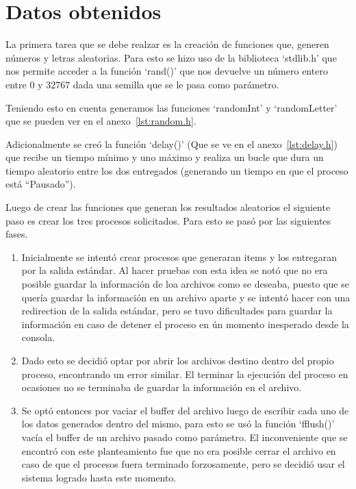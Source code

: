 \section{Datos obtenidos}

La primera tarea que se debe realzar es la creación de funciones que, generen números y letras aleatorias. Para esto se hizo uso de la biblioteca `stdlib.h' que nos permite acceder a la función `rand()' que nos devuelve un número entero entre $0$ y $32767$ dada una semilla que se le pasa como parámetro.

Teniendo esto en cuenta generamos las funciones `randomInt' y `randomLetter' que se pueden ver en el anexo~\ref{lst:random.h}.

Adicionalmente se creó la función `delay()'  (Que se ve en el anexo~\ref{lst:delay.h}) que recibe un tiempo mínimo y uno máximo y realiza un bucle que dura un tiempo aleatorio entre los dos entregados (generando un tiempo en que el proceso está ``Pausado'').

Luego de crear las funciones que generan los resultados aleatorios el siguiente paso es crear los tres procesos solicitados. Para esto se pasó por las siguientes fases.
\begin{enumerate}
    \item Inicialmente se intentó crear procesos que generaran items y los entregaran por la salida estándar.
    Al hacer pruebas con esta idea se notó que no era posible guardar la información de loa archivos como se deseaba, puesto que se quería guardar la información en un archivo aparte y se intentó hacer con una redirection de la salida estándar, pero se tuvo dificultades para guardar la información en caso de detener el proceso en ún momento inesperado desde la consola.
    \item Dado esto se decidió optar por abrir los archivos destino dentro del propio proceso, encontrando un error similar.
    El terminar la ejecución del proceso en ocasiones no se terminaba de guardar la información en el archivo.
    \item Se optó entonces por vaciar el buffer del archivo luego de escribir cada uno de los datos generados dentro del mismo, para esto se usó la función `fflush()' vacía el buffer de un archivo pasado como parámetro.
    El inconveniente que se encontró con este planteamiento fue que no era posible cerrar el archivo en caso de que el procesos fuera terminado forzosamente, pero se decidió usar el sistema logrado hasta este momento.
\end{enumerate}

